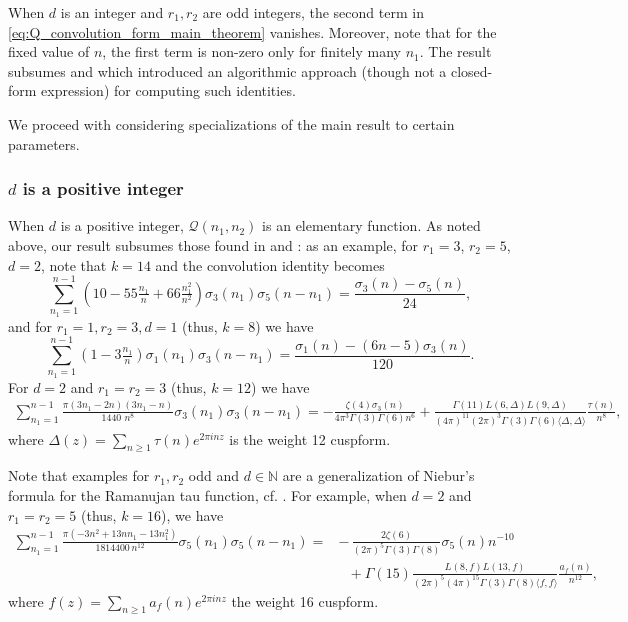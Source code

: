 \documentclass[]{article}
\begin{document}
 When $d$ is an integer and $r_1, r_2$ are odd integers, the second term in \eqref{eq:Q_convolution_form_main_theorem} vanishes. Moreover, note that for the fixed value of $n$, the first term is non-zero only for finitely many $n_1$. The result subsumes  \cite[Section 4.2]{diamantis2010kernels} and \cite{o2023identities} which introduced an algorithmic approach (though not a closed-form expression) for computing such identities.


We proceed with considering specializations of the main result to certain parameters.


\subsubsection{$d$ is a positive integer}\label{sec:d_positive_integer_examples}
 When $d$ is a positive integer, $\mathcal{Q}(n_1,n_2)$ is an elementary function.
As noted above, our result subsumes those found in \cite[Section 4.2]{diamantis2010kernels} and \cite{o2023identities}:  as an example, for $r_1 = 3$, $r_2 = 5$, $d=2$, note that $k=14$ and the convolution identity becomes 
\begin{equation}
    \sum_{n_1 = 1}^{n-1}\left(  10 -55 \tfrac{n_1}{n} +66 \tfrac{n_1^2}{n^2} \right)\sigma _{3}(n_1) \sigma_{5}(n-n_1) =\frac{\sigma _3(n)-\sigma _5(n)}{24},
\end{equation}
 and for $r_1 = 1, r_2 = 3, d=1$ (thus, $k=8$) we have 
\begin{equation}\label{eq:identity_osullivanooooeo}
    \sum _{n_1=1}^{n-1} (1- 3 \tfrac{n_1}{n}) \sigma_{1}(n_1) \sigma _{3}(n-n_1) = 
    \frac{\sigma _1(n)- (6n-5)\sigma _3(n)}
    {120}.
\end{equation}
For $d=2$ and $r_1=r_2=3$ (thus, $k=12$) we have
\begin{align}
   \sum _{n_1=1}^{n-1}
\frac{\pi   (3n_1-2 n) (3 n_1-n) }{1440\,\, n^8}\sigma_{3}(n_1) \sigma _{3}(n-n_1) = -  \frac{\zeta(4) \sigma_{3}(n) }{4 \pi^{3}\Gamma(3) \Gamma(6)n^6} 
+ \frac{\Gamma(11)L( 6,\Delta) L( 9, \Delta )}{ (4 \pi )^{11} (2 \pi)^{3}\Gamma(3) \Gamma(6) \langle  \Delta,   \Delta \rangle }  \frac{\tau(n)}{n^{8}},
\end{align}
where $\Delta(z) = \sum_{n\geq 1} \tau(n) e^{2\pi i n z}$ is the weight 12 cuspform. 



Note that examples for $r_1, r_2$ odd and $d \in \mathbb{N}$ are a  generalization of Niebur's formula for the Ramanujan tau function, cf. \cite[Section 4.2]{diamantis2010kernels}. For example,
when $d=2$ and $r_1=r_2=5$ (thus, $k=16$), we have 
\begin{align}
   \sum _{n_1=1}^{n-1}
\frac{\pi (-3 n^2+13 n n_1-13 n_1^2)}{1814400\, n^{12}}\sigma_{5}(n_1) \sigma _{5}(n-n_1) 
=    & - \,\frac{2\zeta(6)}{(2 \pi)^{5}\Gamma(3) \Gamma(8)} \sigma_{5}(n) n^{-10}\nonumber \\ & 
\ \ \ +   \Gamma(15) \frac{L( 8,f ) L( 13, f ) }{(2 \pi)^{5}(4 \pi )^{15} \Gamma(3) \Gamma(8)  \langle f,  f \rangle } \frac{a_f(n)}{n^{12}},
\end{align}
where $f(z)=\sum_{n\geq 1}{a_f(n)}e^{2\pi i n z}$ the weight 16 cuspform. 
\end{document}
